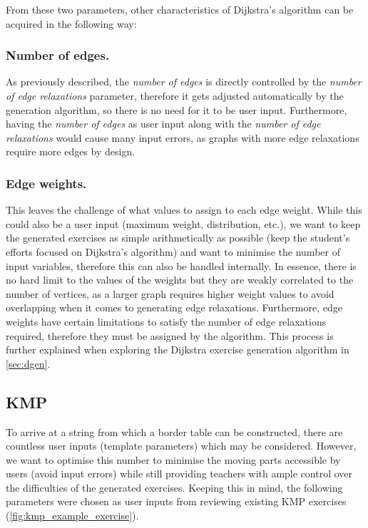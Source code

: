 \documentclass{l4proj}
\begin{document}
From these two parameters, other characteristics of Dijkstra's algorithm can be acquired in the following way:

\subsubsection{Number of edges.}
\label{sec:noe}

As previously described, the \emph{number of edges} is directly controlled by the \emph{number of edge relaxations} parameter, therefore it gets adjusted automatically by the generation algorithm, so there is no need for it to be user input. Furthermore, having the \emph{number of edges} as user input along with the \emph{number of edge relaxations} would cause many input errors, as graphs with more edge relaxations require more edges by design. 

\subsubsection{Edge weights.}

This leaves the challenge of what values to assign to each edge weight. While this could also be a user input (maximum weight, distribution, etc.), we want to keep the generated exercises as simple arithmetically as possible (keep the student's efforts focused on Dijkstra's algorithm) and want to minimise the number of input variables, therefore this can also be handled internally. In essence, there is no hard limit to the values of the weights but they are weakly correlated to the number of vertices, as a larger graph requires higher weight values to avoid overlapping when it comes to generating edge relaxations. Furthermore, edge weights have certain limitations to satisfy the number of edge relaxations required, therefore they must be assigned by the algorithm. This process is further explained when exploring the Dijkstra exercise generation algorithm in \autoref{sec:dgen}. 

\subsection{KMP}

To arrive at a string from which a border table can be constructed, there are countless user inputs (template parameters) which may be considered. However, we want to optimise this number to minimise the moving parts accessible by users (avoid input errors) while still providing teachers with ample control over the difficulties of the generated exercises. Keeping this in mind, the following parameters were chosen as user inputs from reviewing existing KMP exercises (\autoref{fig:kmp_example_exercise}).
\end{document}
